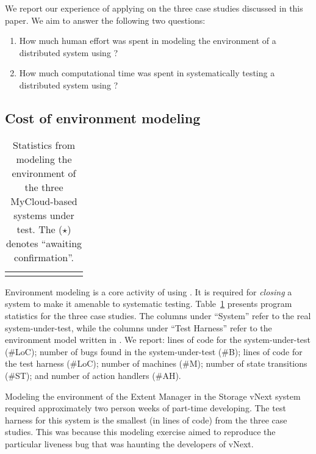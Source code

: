 We report our experience of applying \psharp on the three case studies discussed in this paper. We aim to answer the following two questions:

\begin{enumerate}
\item How much human effort was spent in modeling the environment of a distributed system using \psharp?

\item How much computational time was spent in systematically testing a distributed system using \psharp?
\end{enumerate}

\subsection{Cost of environment modeling}
\label{sec:eval:human_cost}

\newcommand{\colspacing}{\hspace{1.8em}}
\begin{table}[t]
\small
\centering
\setlength{\tabcolsep}{0.3em}
\begin{tabular}{l rrrrr rr}
\centering

\end{tabular}
\caption{Statistics from modeling the environment of the three \Microsoft MyCloud-based systems under test. The ($\star$) denotes ``awaiting confirmation''.}
\label{tab:stats}
\end{table}

Environment modeling is a core activity of using \psharp. It is required for \emph{closing} a system to make it amenable to systematic testing. Table~\ref{tab:stats} presents program statistics for the three case studies. The columns under ``System'' refer to the real system-under-test, while the columns under ``\psharp Test Harness'' refer to the environment model written in \psharp. We report: lines of code for the system-under-test (\#LoC); number of bugs found in the system-under-test (\#B); lines of \psharp code for the test harness (\#LoC); number of machines (\#M); number of state transitions (\#ST); and number of action handlers (\#AH).

Modeling the environment of the Extent Manager in the \Azure Storage vNext system required approximately two person weeks of part-time developing. The \psharp test harness for this system is the smallest (in lines of code) from the three case studies. This was because this modeling exercise aimed to reproduce the particular liveness bug that was haunting the developers of vNext.

